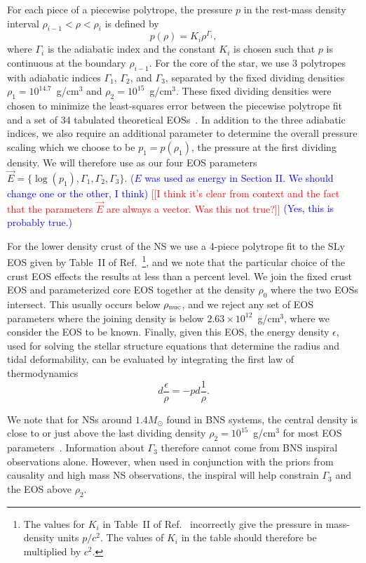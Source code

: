 \documentclass[twocolumn,prd,amssymb,aps,nofootinbib,showpacs,epsf]{revtex4}
\newcommand\ben[2]{\textcolor{red}{{#1}\sout{#2}}}
\newcommand\les[2]{\textcolor{blue}{{#1}\sout{#2}}}
\begin{document}
For each piece of a piecewise polytrope, the pressure $p$ in the rest-mass density interval $\rho_{i-1} < \rho < \rho_i$ is defined by
\begin{equation}
p(\rho) = K_i \rho^{\Gamma_i},
\end{equation}
where $\Gamma_i$ is the adiabatic index and the constant $K_i$ is chosen such that $p$ is continuous at the boundary $\rho_{i-1}$. For the core of the star, we use 3 polytropes with adiabatic indices $\Gamma_1$, $\Gamma_2$, and $\Gamma_3$, separated by the fixed dividing densities $\rho_1 = 10^{14.7}$~g/cm$^3$ and $\rho_2 = 10^{15}$~g/cm$^3$. These fixed dividing densities were chosen to minimize the least-squares error between the piecewise polytrope fit and a set of 34 tabulated theoretical EOSs~\cite{ReadLackey2009}. In addition to the three adiabatic indices, we also require an additional parameter to determine the overall pressure scaling which we choose to be $p_1 = p(\rho_1)$, the pressure at the first dividing density. We will therefore use as our four EOS parameters $\vec E = \{\log(p_1), \Gamma_1, \Gamma_2, \Gamma_3\}$. \les{($E$ was used as energy in Section II.  We should change one or the other, I think)}{} \ben{[[I think it's clear from context and the fact that the parameters $\vec E$ are always a vector. Was this not true?]]}{} \les{(Yes, this is probably true.)}{}

For the lower density crust of the NS we use a 4-piece polytrope fit to the SLy EOS given by Table~II of Ref.~\cite{ReadLackey2009}\footnote{The values for $K_i$ in Table~II of Ref.~\cite{ReadLackey2009} incorrectly give the pressure in mass-density units $p/c^2$. The values of $K_i$ in the table should therefore be multiplied by $c^2$.}, and we note that the particular choice of the crust EOS effects the results at less than a percent level. We join the fixed crust EOS and parameterized core EOS together at the density $\rho_0$ where the two EOSs intersect. This usually occurs below $\rho_{\rm nuc}$, and we reject any set of EOS parameters where the joining density is below $2.63\times 10^{12}$~g/cm$^3$, where we consider the EOS to be known. Finally, given this EOS, the energy density $\epsilon$, used for solving the stellar structure equations that determine the radius and tidal deformability, can be evaluated by integrating the first law of thermodynamics
\begin{equation}
d\frac{\epsilon}{\rho} = - p d\frac{1}{\rho}.
\end{equation}

We note that for NSs around $1.4M_\odot$ found in BNS systems, the central density is close to or just above the last dividing density $\rho_2 = 10^{15}$~g/cm$^3$ for most EOS parameters~\cite{ReadLackey2009}. Information about $\Gamma_3$ therefore cannot come from BNS inspiral observations alone. However, when used in conjunction with the priors from causality and high mass NS observations, the inspiral will help constrain $\Gamma_3$ and the EOS above $\rho_2$.
\end{document}
